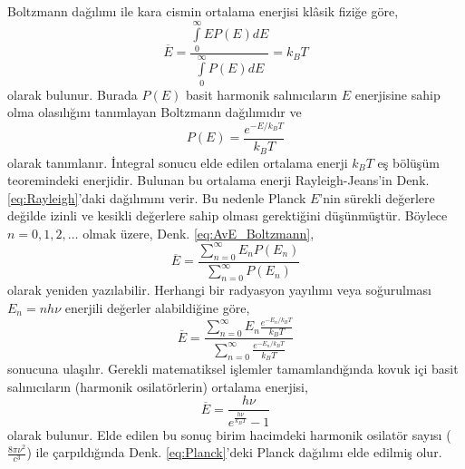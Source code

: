 \documentclass[a4paper,12pt, twoside]{article}
\begin{document}
Boltzmann dağılımı ile kara cismin ortalama enerjisi klâsik fiziğe göre,
\begin{equation}
\label{eq:AvE_Boltzmann}
\overline E =\frac{\int \limits_0^\infty E P(E) dE}{\int \limits_0^\infty P(E) dE} = k_B T
\end{equation} 
olarak bulunur. Burada $P(E)$ basit harmonik salınıcıların $E$ enerjisine sahip olma olasılığını tanımlayan Boltzmann dağılımıdır ve
\begin{equation}
\label{eq:Boltzmann}
P(E) = \frac{e^{-E/k_BT}}{k_BT}
\end{equation} 
olarak tanımlanır. İntegral sonucu elde edilen ortalama enerji $k_B T$ eş bölüşüm teoremindeki enerjidir. Bulunan bu ortalama enerji Rayleigh-Jeans'in Denk. \ref{eq:Rayleigh}'daki dağılımını verir. Bu nedenle Planck $E$'nin sürekli değerlere değilde izinli ve kesikli değerlere sahip olması gerektiğini düşünmüştür. Böylece $n = 0, 1, 2, \dots$  olmak üzere, Denk. \ref{eq:AvE_Boltzmann},
\begin{equation}
\label{eq:Boltzmann_Planck}
\overline E =\frac{\sum \limits_{n=0}^\infty E_n P(E_n)}{\sum \limits_{n=0}^\infty P(E_n)} 
\end{equation}
olarak yeniden yazılabilir. Herhangi bir radyasyon yayılımı veya soğurulması $E_n=n h\nu$ enerjili değerler alabildiğine göre,
\begin{equation}
\label{eq:Boltzmann_Planck}
\overline E =\frac{\sum \limits_{n=0}^\infty E_n \frac{e^{-E_n/k_BT}}{k_BT}}{\sum \limits_{n=0}^\infty \frac{e^{-E_n/k_BT}}{k_BT}} 
\end{equation}
sonucuna ulaşılır. Gerekli matematiksel işlemler tamamlandığında \cite{book:EisbergResnick} kovuk içi basit salınıcıların (harmonik osilatörlerin) ortalama enerjisi,
\begin{equation}
\label{eq:Planck_Av_E}
\overline E = \frac{h\nu}{e^{\frac{h \nu}{k_{B} T}} - 1}
\end{equation}
olarak bulunur. Elde edilen bu sonuç birim hacimdeki harmonik osilatör sayısı ($\frac{8 \pi \nu^{2}}{c^{3}}$) ile çarpıldığında Denk. \ref{eq:Planck}'deki Planck dağılımı elde edilmiş olur. 
\end{document}
